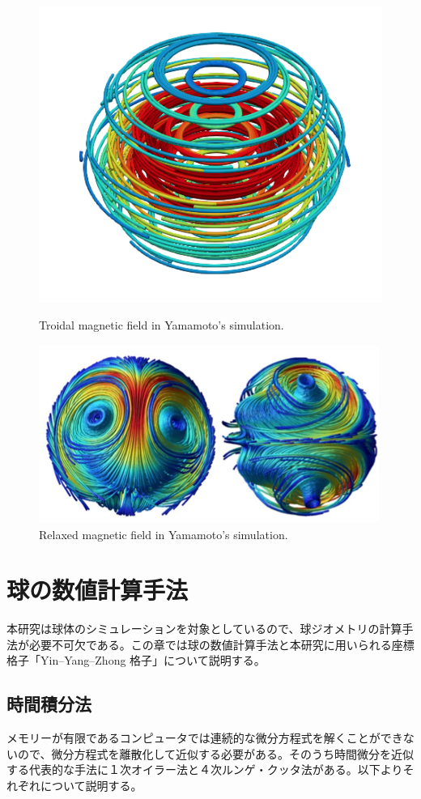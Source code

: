 \documentclass[12pt]{jsarticle}
\begin{document}
\begin{figure}[H]
\centering
\includegraphics[height=0.3\textheight,width=0.6\hsize,angle=0,keepaspectratio]{./Image/init_mag_12.png}
\caption{Troidal magnetic field in Yamamoto's simulation.}
\includegraphics[height=0.3\textheight,width=0.6\hsize,angle=0,keepaspectratio]{./Image/Yamamoto_relaxation.png}
\caption{Relaxed magnetic field in Yamamoto's simulation.}\label{fig:Mag2}
\end{figure}
 
 
\section{球の数値計算手法}

本研究は球体のシミュレーションを対象としているので、球ジオメトリの計算手法が必要不可欠である。この章では球の数値計算手法と本研究に用いられる座標格子「Yin--Yang--Zhong 格子」について説明する。
\subsection{時間積分法}
メモリーが有限であるコンピュータでは連続的な微分方程式を解くことができないので、微分方程式を離散化して近似する必要がある。そのうち時間微分を近似する代表的な手法に１次オイラー法と４次ルンゲ・クッタ法がある。以下よりそれぞれについて説明する。
\end{document}
